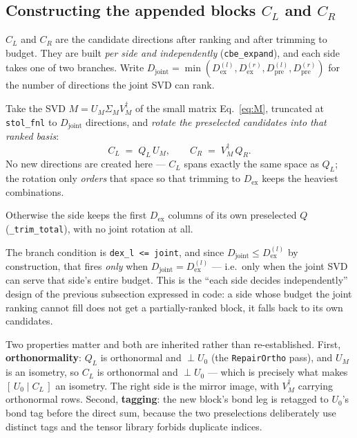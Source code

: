 \documentclass[11pt,a4paper]{article}
\newcommand{\Dex}{D_{\mathrm{ex}}}
\newcommand{\Dpre}{D_{\mathrm{pre}}}
\newcommand{\Djoint}{D_{\mathrm{joint}}}
\newcommand{\code}[1]{\texttt{\small #1}}
\begin{document}
\subsection{Constructing the appended blocks \texorpdfstring{$C_L$}{CL} and \texorpdfstring{$C_R$}{CR}}
\label{sec:clcr}

$C_L$ and $C_R$ are the candidate directions after ranking and after trimming to budget. They are
built \emph{per side and independently} (\code{cbe\_expand}), and each side takes one of two
branches. Write $\Djoint = \min(\Dex^{(l)}, \Dex^{(r)}, \Dpre^{(l)}, \Dpre^{(r)})$ for the number
of directions the joint SVD can rank.

\begin{description}[leftmargin=1.4em,style=nextline]
\item[Ranked branch.] Take the SVD $M = U_M \Sigma_M V_M^\dagger$ of the small matrix
Eq.~\eqref{eq:M}, truncated at \code{stol\_fnl} to $\Djoint$ directions, and \emph{rotate the
preselected candidates into that ranked basis}:
\begin{equation}
  C_L \;=\; Q_L\,U_M,
  \qquad
  C_R \;=\; V_M^\dagger\,Q_R .
  \label{eq:clcr}
\end{equation}
No new directions are created here --- $C_L$ spans exactly the same space as $Q_L$; the rotation
only \emph{orders} that space so that trimming to $\Dex$ keeps the heaviest combinations.

\item[Fallback branch.] Otherwise the side keeps the first $\Dex$ columns of its own preselected
$Q$ (\code{\_trim\_total}), with no joint rotation at all.
\end{description}

\noindent
The branch condition is \code{dex\_l <= joint}, and since $\Djoint \le \Dex^{(l)}$ by
construction, that fires \emph{only} when $\Djoint = \Dex^{(l)}$ --- i.e.\ only when the joint SVD
can serve that side's entire budget. This is the ``each side decides independently'' design of the
previous subsection expressed in code: a side whose budget the joint ranking cannot fill does not
get a partially-ranked block, it falls back to its own candidates.

Two properties matter and both are inherited rather than re-established. First,
\textbf{orthonormality}: $Q_L$ is orthonormal and $\perp U_0$ (the \code{RepairOrtho} pass), and
$U_M$ is an isometry, so $C_L$ is orthonormal and $\perp U_0$ --- which is precisely what makes
$[\,U_0 \mid C_L\,]$ an isometry. The right side is the mirror image, with $V_M^\dagger$ carrying
orthonormal rows. Second, \textbf{tagging}: the new block's bond leg is retagged to $U_0$'s bond
tag before the direct sum, because the two preselections deliberately use distinct tags and the
tensor library forbids duplicate indices.
\end{document}
